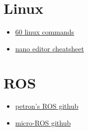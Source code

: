 \documentclass[11pt,fleqn]{book} %
\begin{document}
\section{Linux}
\begin{itemize}
    \item \hyperlink{https://www.youtube.com/watch?v=gd7BXuUQ91w}{60 linux commands}
    \item \hyperlink{https://www.nano-editor.org/dist/latest/cheatsheet.html}{nano editor cheatsheet}
\end{itemize}
\section{ROS}
\begin{itemize}
    \item \hyperlink{https://github.com/emmanuel-olateju/ROS_tutorial}{petron's ROS github}
    \item \hyperlink{https://github.com/micro-ROS/}{micro-ROS github}
\end{itemize}
\end{document}
